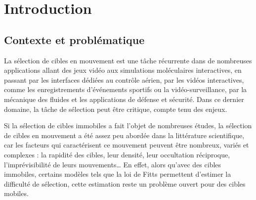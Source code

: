 

\chapter*{Introduction} %
\mtcaddchapter %


\section*{Contexte et problématique}
	La sélection de cibles en mouvement est une tâche récurrente dans de nombreuses applications allant des jeux vidéo aux simulations moléculaires interactives, en passant par les interfaces dédiées au contrôle aérien, par les vidéos interactives, comme les enregistrements d'événements sportifs ou la vidéo-surveillance, par la mécanique des fluides et les applications de défense et sécurité. Dans ce dernier domaine, la tâche de sélection peut être critique, compte tenu des enjeux.
	
	Si la sélection de cibles immobiles a fait l'objet de nombreuses études, la sélection de cibles en mouvement a été assez peu abordée dans la littérature scientifique, car les facteurs qui caractérisent ce mouvement peuvent être nombreux, variés et complexes : la rapidité des cibles, leur densité, leur occultation réciproque, l'imprévisibilité de leurs mouvements\ldots{} En effet, alors qu’avec des cibles immobiles, certains modèles tels que la loi de Fitts permettent d’estimer la difficulté de sélection, cette estimation reste un problème ouvert pour des cibles mobiles.
	
